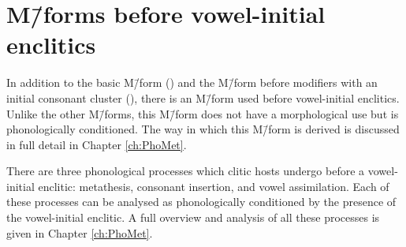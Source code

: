 \section{M\=/forms before vowel-initial enclitics}\label{sec:MforBefEnc}
In addition to the basic M\=/form (\M) and the M\=/form
before modifiers with an initial consonant cluster (\Mc),
there is an M\=/form used before vowel-initial enclitics.
Unlike the other M\=/forms, this M\=/form does not have a morphological
use but is phonologically conditioned.
The way in which this M\=/form is derived is discussed
in full detail in Chapter \ref{ch:PhoMet}.

There are three phonological processes which clitic
hosts undergo before a vowel-initial enclitic:
metathesis, consonant insertion, and vowel assimilation.
Each of these processes can be analysed as
phonologically conditioned by the presence of the vowel-initial enclitic.
A full overview and analysis of all these processes
is given in Chapter \ref{ch:PhoMet}.
